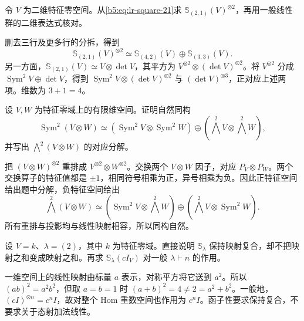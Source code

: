 \begin{exercise}\label{b5:ex:07-lr-dimension-two}
	令 \(V\) 为二维特征零空间。从\eqref{b5:eq:lr-square-21}求 \(\mathbb S_{(2,1)}(V)^{\otimes2}\)，再用一般线性群的二维表达式核对。
\end{exercise}
\begin{solution}
	删去三行及更多行的分拆，得到
	\[
		\mathbb S_{(2,1)}(V)^{\otimes2} \simeq\mathbb S_{(4,2)}(V)\oplus\mathbb S_{(3,3)}(V).
	\]
	另一方面，\(\mathbb S_{(2,1)}(V)\simeq V\otimes\det V\)，其平方为 \(V^{\otimes2}\otimes(\det V)^{\otimes2}\)。将 \(V^{\otimes2}\) 分成 \(\operatorname{Sym}^2V\oplus\det V\)，得到 \(\operatorname{Sym}^2V\otimes(\det V)^{\otimes2}\) 与 \((\det V)^{\otimes3}\)，正对应上述两项。维数为 \(3+1=4\)。
\end{solution}

\begin{exercise}\label{b5:ex:07-cauchy-degree-two}
	设 \(V,W\) 为特征零域上的有限维空间。证明自然同构
	\[
		\operatorname{Sym}^2(V\otimes W) \simeq (\operatorname{Sym}^2V\otimes\operatorname{Sym}^2W) \oplus(\bigwedge^2V\otimes\bigwedge^2W),
	\]
	并写出 \(\bigwedge^2(V\otimes W)\) 的对应分解。
\end{exercise}
\begin{solution}
	把 \((V\otimes W)^{\otimes2}\) 重排成 \(V^{\otimes2}\otimes W^{\otimes2}\)。交换两个 \(V\otimes W\) 因子，对应 \(P_V\otimes P_W\)。两个交换算子的特征值都是 \(\pm1\)，相同符号相乘为正，异号相乘为负。因此正特征空间给出题中分解，负特征空间给出
	\[
		\bigwedge^2(V\otimes W) \simeq(\operatorname{Sym}^2V\otimes\bigwedge^2W) \oplus(\bigwedge^2V\otimes\operatorname{Sym}^2W).
	\]
	所有重排与投影均与线性映射相容，所以同构自然。
\end{solution}

\begin{exercise}\label{b5:ex:07-schur-functor-nonlinearity}
	设 \(V=k\)、\(\lambda=(2)\)，其中 \(k\) 为特征零域。直接说明 \(\mathbb S_\lambda\) 保持映射复合，却不把映射之和变成映射之和。再求 \(\mathbb S_\lambda(cI_V)\) 对一般 \(\lambda\vdash n\) 的作用。
\end{exercise}
\begin{solution}
	一维空间上的线性映射由标量 \(a\) 表示，对称平方将它送到 \(a^2\)。所以 \((ab)^2=a^2b^2\)，但取 \(a=b=1\) 时 \((a+b)^2=4\ne2=a^2+b^2\)。一般地，\((cI)^{\otimes n}=c^nI\)，故对整个 Hom 重数空间也作用为 \(c^nI\)。函子性要求保持复合，不要求关于态射加法线性。
\end{solution}

